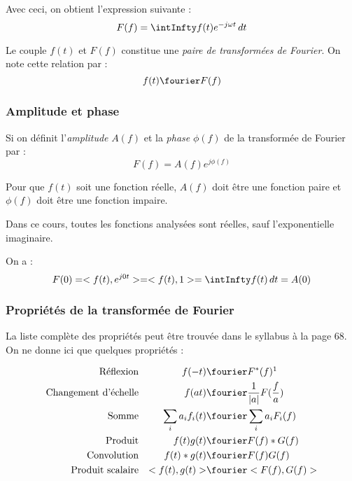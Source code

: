             Avec ceci, on obtient l'expression suivante :
            \begin{equation}
                F(f) = \intInfty f(t) e^{-j\omega t}\,dt
                \label{eq:transformeeFourier}
            \end{equation}

            Le couple $f(t)$ et $F(f)$ constitue une \textit{paire de transformées de Fourier}. On note cette relation par :
            $$
                f(t) \fourier F(f)
            $$

            \subsubsection{Amplitude et phase}
                Si on définit l'\textit{amplitude} $A(f)$ et la \textit{phase} $\phi(f)$ de la transformée de Fourier par :
                $$
                    F(f) = A(f) e^{j\phi(f)}
                $$
                
                Pour que $f(t)$ soit une fonction réelle, $A(f)$ doit être une fonction paire et $\phi(f)$ doit être une fonction impaire.

                \begin{remarque}
                    Dans ce cours, toutes les fonctions analysées sont réelles, sauf l'exponentielle imaginaire.
                \end{remarque}

                On a :
                $$
                    F(0) = <f(t), e^{j 0 t}> = <f(t), 1> = \intInfty f(t)\,dt = A(0)
                $$

            \subsubsection{Propriétés de la transformée de Fourier}
                La liste complète des propriétés peut être trouvée dans le syllabus à la page 68. On ne donne ici que quelques propriétés :

                \begin{align*}
                    \mbox{Réflexion} && f(-t) &\fourier F^*(f)\footnotemark\\
                    \mbox{Changement d'échelle} && f(at) &\fourier \frac{1}{|a|}F(\frac{f}{a})\\
                    \mbox{Somme} && \sum_i a_if_i(t) &\fourier \sum_i a_i F_i(f)\\
                    \mbox{Produit} && f(t)g(t) &\fourier F(f)*G(f)\\
                    \mbox{Convolution} && f(t)*g(t) &\fourier F(f)G(f)\\
                    \mbox{Produit scalaire} && <f(t), g(t)> &\fourier <F(f), G(f)>
                \end{align*}


